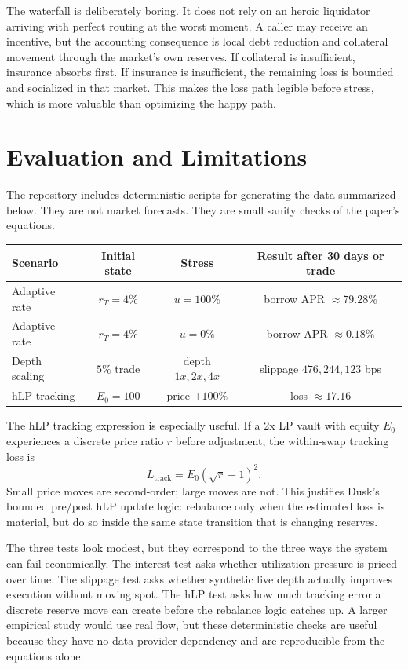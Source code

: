 \documentclass[11pt]{article}
\begin{document}
The waterfall is deliberately boring. It does not rely on an heroic liquidator arriving with perfect routing at the worst moment. A caller may receive an incentive, but the accounting consequence is local debt reduction and collateral movement through the market's own reserves. If collateral is insufficient, insurance absorbs first. If insurance is insufficient, the remaining loss is bounded and socialized in that market. This makes the loss path legible before stress, which is more valuable than optimizing the happy path.

\section{Evaluation and Limitations}

The repository includes deterministic scripts for generating the data summarized below. They are not market forecasts. They are small sanity checks of the paper's equations.

\begin{center}
\begin{tabular}{lccc}
\toprule
Scenario & Initial state & Stress & Result after 30 days or trade \\
\midrule
Adaptive rate & $r_T=4\%$ & $u=100\%$ & borrow APR $\approx79.28\%$ \\
Adaptive rate & $r_T=4\%$ & $u=0\%$ & borrow APR $\approx0.18\%$ \\
Depth scaling & $5\%$ trade & depth $1x,2x,4x$ & slippage $476,244,123$ bps \\
hLP tracking & $E_0=100$ & price $+100\%$ & loss $\approx17.16$ \\
\bottomrule
\end{tabular}
\end{center}

The hLP tracking expression is especially useful. If a 2x LP vault with equity $E_0$ experiences a discrete price ratio $r$ before adjustment, the within-swap tracking loss is
\begin{equation}
L_{\mathrm{track}}=E_0(\sqrt r-1)^2.
\end{equation}
Small price moves are second-order; large moves are not. This justifies Dusk's bounded pre/post hLP update logic: rebalance only when the estimated loss is material, but do so inside the same state transition that is changing reserves.

The three tests look modest, but they correspond to the three ways the system can fail economically. The interest test asks whether utilization pressure is priced over time. The slippage test asks whether synthetic live depth actually improves execution without moving spot. The hLP test asks how much tracking error a discrete reserve move can create before the rebalance logic catches up. A larger empirical study would use real flow, but these deterministic checks are useful because they have no data-provider dependency and are reproducible from the equations alone.
\end{document}
